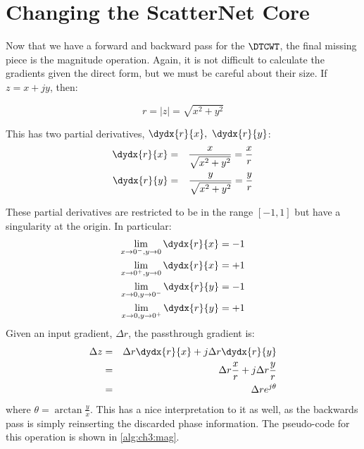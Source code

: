 \section{Changing the ScatterNet Core}\label{sec:ch3:scat}
Now that we have a forward and backward pass for the $\DTCWT$, the final missing
piece is the magnitude operation. Again, it is not difficult to calculate the
gradients given the direct form, but we must be careful about their size. If $z
= x + jy$, then:

\begin{equation}
  r = |z| =  \sqrt{x^2 + y^2}
\end{equation}

This has two partial derivatives, $\dydx{r}{x},\ \dydx{r}{y}$:
\begin{eqnarray}
  \dydx{r}{x} & = & \frac{x}{\sqrt{x^2 + y^2}} = \frac{x}{r}\\
  \dydx{r}{y} & = & \frac{y}{\sqrt{x^2 + y^2}} = \frac{y}{r} 
\end{eqnarray}

These partial derivatives are restricted to be in the range $[-1, 1]$ but have a singularity at the origin. 
In particular:
\begin{align}
  \lim_{x\rightarrow 0^{-},y\rightarrow 0}  \dydx{r}{x} &= -1 \\
  \lim_{x\rightarrow 0^{+},y\rightarrow 0}  \dydx{r}{x} &= +1 \\
  \lim_{x\rightarrow 0,y\rightarrow 0^{-}}  \dydx{r}{y} &= -1 \\
  \lim_{x\rightarrow 0,y\rightarrow 0^{+}}  \dydx{r}{y} &= +1 
\end{align}
Given an input gradient, $\Delta r$, the passthrough gradient is:
\begin{eqnarray}
  \Delta z & = & \Delta r \dydx{r}{x} + j\Delta r \dydx{r}{y} \\
           &= & \Delta r \frac{x}{r} + j\Delta r \frac{y}{r} \\
           &=& \Delta r e^{j\theta}
\end{eqnarray}
where $\theta = \arctan{\frac{y}{x}}$. This has a nice interpretation to it as
well, as the backwards pass is simply reinserting the discarded phase
information. The pseudo-code for this operation is shown in
\autoref{alg:ch3:mag}.

